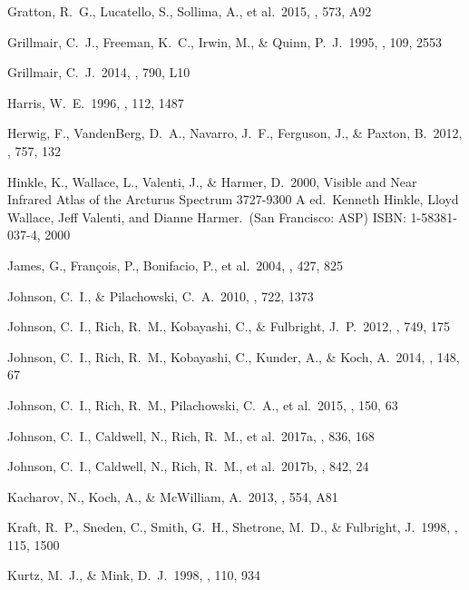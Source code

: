 \documentclass[12pt,preprint]{emulateapj}
\begin{document}
\begin{thebibliography}{}
 Gratton, R.~G., Lucatello, S., Sollima, A., et al.\ 2015, \aap, 573, A92

 Grillmair, C.~J., Freeman, K.~C., Irwin, M., \& Quinn, P.~J.\ 1995, \aj, 109, 2553 

 Grillmair, C.~J.\ 2014, \apjl, 790, L10

 Harris, W.~E.\ 1996, \aj, 112, 1487

 Herwig, F., VandenBerg, D.~A., Navarro, J.~F., Ferguson, J., \& Paxton, B.\ 2012, \apj, 757, 132

 Hinkle, K., Wallace, L., Valenti, J., \& Harmer, D.\ 2000, Visible and Near Infrared Atlas of the Arcturus Spectrum 3727-9300 A ed.~Kenneth Hinkle, Lloyd Wallace, Jeff Valenti, and Dianne Harmer.~(San Francisco: ASP) ISBN: 1-58381-037-4, 2000

 James, G., Fran{\c c}ois, P., Bonifacio, P., et al.\ 2004, \aap, 427, 825

 Johnson, C.~I., \& Pilachowski, C.~A.\ 2010, \apj, 722, 1373

 Johnson, C.~I., Rich, R.~M., Kobayashi, C., \& Fulbright, J.~P.\ 2012, \apj, 749, 175

 Johnson, C.~I., Rich, R.~M., Kobayashi, C., Kunder, A., \& Koch, A.\ 2014, \aj, 148, 67

 Johnson, C.~I., Rich, R.~M., Pilachowski, C.~A., et al.\ 2015, \aj, 150, 63

 Johnson, C.~I., Caldwell, N., Rich, R.~M., et al.\ 2017a, \apj, 836, 168

 Johnson, C.~I., Caldwell, N., Rich, R.~M., et al.\ 2017b, \apj, 842, 24

 Kacharov, N., Koch, A., \& McWilliam, A.\ 2013, \aap, 554, A81

 Kraft, R.~P., Sneden, C., Smith, G.~H., Shetrone, M.~D., \& Fulbright, J.\ 1998, \aj, 115, 1500

 Kurtz, M.~J., \& Mink, D.~J.\ 1998, \pasp, 110, 934


\end{thebibliography}
\end{document}
